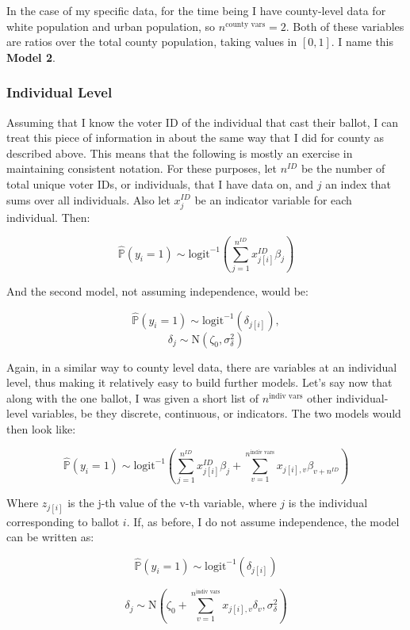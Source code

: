 \documentclass[12pt,twoside]{reedthesis}
\begin{document}
  In the case of my specific data, for the time being I have county-level
  data for white population and urban population, so
  \(n^{\text{county vars}} = 2\). Both of these variables are ratios over
  the total county population, taking values in \([0,1]\). I name this
  \textbf{Model 2}.
  
  \subsubsection{Individual Level}\label{individual-level}
  
  Assuming that I know the voter ID of the individual that cast their
  ballot, I can treat this piece of information in about the same way that
  I did for county as described above. This means that the following is
  mostly an exercise in maintaining consistent notation. For these
  purposes, let \(n^{ID}\) be the number of total unique voter IDs, or
  individuals, that I have data on, and \(j\) an index that sums over all
  individuals. Also let \(x_{j}^{ID}\) be an indicator variable for each
  individual. Then:
  
  \[\hat{\mathbb{P}}(y_i = 1) \sim \text{logit}^{-1}(\sum_{j = 1}^{n^{ID}}x_{j[i]}^{ID}\beta_{j})\]
  
  And the second model, not assuming independence, would be:
  
  \[\hat{\mathbb{P}}(y_i = 1) \sim \text{logit}^{-1}(\delta_{j[i]}), \]
  \[\delta_{j} \sim \text{N}(\zeta_0, \sigma_{\delta}^2)\]
  
  Again, in a similar way to county level data, there are variables at an
  individual level, thus making it relatively easy to build further
  models. Let's say now that along with the one ballot, I was given a
  short list of \(n^{\text{indiv vars}}\) other individual-level
  variables, be they discrete, continuous, or indicators. The two models
  would then look like:
  
  \[\hat{\mathbb{P}}(y_i = 1) \sim \text{logit}^{-1}(\sum_{j = 1}^{n^{ID}}x_{j[i]}^{ID}\beta_{j} + \sum_{v=1}^{n^{\text{indiv vars}}}x_{j[i], v}\beta_{v+n^{ID}})\]
  
  Where \(z_{j[i]}\) is the j-th value of the v-th variable, where \(j\)
  is the individual corresponding to ballot \(i\). If, as before, I do not
  assume independence, the model can be written as:
  
  \[\hat{\mathbb{P}}(y_i = 1) \sim \text{logit}^{-1}(\delta_{j[i]})\]
  
  \[\delta_{j} \sim \text{N}(\zeta_0 + \sum_{v=1}^{n^{\text{indiv vars}}}x_{j[i], v}\delta_{v}, \sigma_{\delta}^2)\]
  
\end{document}
